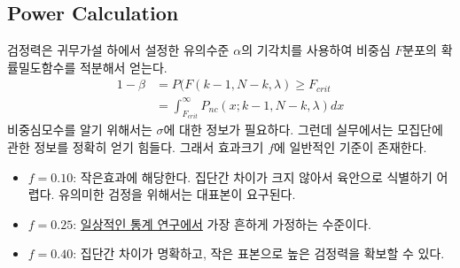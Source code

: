     
\subsection{Power Calculation}
\label{power_calculation}
검정력은 귀무가설 하에서 설정한 유의수준 $\alpha$의 기각치를 사용하여 비중심 $F$분포의 확률밀도함수를 적분해서 얻는다. 
    \begin{align*}
        1-\beta &= P(F(k-1, N-k, \lambda) \geq F_{crit}\\ &= \int^\infty_{F_{crit}}P_{nc}(x; k-1, N-k, \lambda)dx
    \end{align*}
비중심모수를 알기 위해서는 $\sigma$에 대한 정보가 필요하다. 그런데 실무에서는 모집단에 관한 정보를 정확히 얻기 힘들다. 그래서 효과크기 $f$에 일반적인 기준이 존재한다. 
\begin{tcolorbox}[arc=4 mm, colback=blue!5, colframe=black, boxrule=0.1 mm, breakable]
    \begin{itemize}[leftmargin=1.5em]
        \item $f=0.10$: 작은효과에 해당한다. 집단간 차이가 크지 않아서 육안으로 식별하기 어렵다. 유의미한 검정을 위해서는 대표본이 요구된다. 
        \item $f=0.25$: \uline{일상적인 통계 연구에서} 가장 흔하게 가정하는 수준이다. 
        \item $f=0.40$: 집단간 차이가 명확하고, 작은 표본으로 높은 검정력을 확보할 수 있다. 
    \end{itemize}
\end{tcolorbox}






